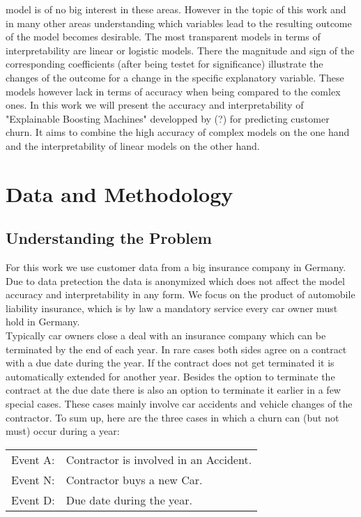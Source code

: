 \documentclass[12pt,titlepage]{article}
\begin{document}
model is of no big interest in these areas. However in the topic of this work and in many other areas understanding which
variables lead to the resulting outcome of the model becomes desirable. The most transparent models in terms of
interpretability are linear or logistic models. There the magnitude and sign of the corresponding coefficients (after being
testet for significance) illustrate the changes of the outcome for a change in the specific explanatory variable. These models
however lack in terms of accuracy when being compared to the comlex ones. In this work we will present the accuracy and
interpretability of "Explainable Boosting Machines" developped by (?) for predicting customer churn. It aims to combine the
high accuracy of complex models on the one hand and the interpretability of linear models on the other hand. \\

\section{Data and Methodology} \par

\subsection{Understanding the Problem} \par

For this work we use customer data from a big insurance company in Germany. Due to data pretection the data is anonymized which
does not affect the model accuracy and interpretability in any form. We focus on the product of automobile liability insurance,
which is by law a mandatory service every car owner must hold in Germany. \\
Typically car owners close a deal with an insurance company which can be terminated by the end of each year. In rare cases both
sides agree on a contract with a due date during the year. If the contract does not get terminated it is automatically extended
for another year. Besides the option to terminate the contract at the due date there is also an option to terminate
it earlier in a few special cases. These cases mainly involve car accidents and vehicle changes of the contractor. To sum up,
here are the three cases in which a churn can (but not must) occur during a year: \\

\begin{center}
    \begin{tabular}{ll}
        Event A: & Contractor is involved in an Accident. \\
        Event N: & Contractor buys a new Car. \\
        Event D: & Due date during the year. \\
    \end{tabular}
\end{center}
\end{document}
